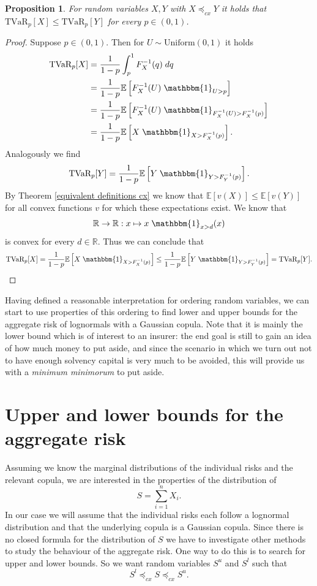\documentclass{article}
\newtheorem{proposition}{Proposition}
\begin{document}
\begin{proposition}\cite[Theorem 6.5.2]{Risk_Measurement}\label{prop: tvar consistent with convex order}
    For random variables $X,Y$ with $X\preceq_{cx}Y$ it holds that $\text{TVaR}_p[X]\leq \text{TVaR}_p[Y] $ for every $p\in (0,1)$.
\end{proposition}
\begin{proof}
    Suppose $p\in (0,1)$. Then for $U\sim \text{Uniform}(0,1)$ it holds
    \begin{align*}
        \text{TVaR}_p[X] &= \frac{1}{1-p} \int_p^1F_X^{-1}(q)\;dq\\
        &= \frac{1}{1-p} \mathbb{E}\left[F_X^{-1}(U)\;\mathbbm{1}_{U > p}\right]\\
        &= \frac{1}{1-p} \mathbb{E}\left[F_X^{-1}(U)\;\mathbbm{1}_{F_X^{-1}(U) > F_X^{-1}(p)}\right] \\
        &= \frac{1}{1-p} \mathbb{E}\left[X\;\mathbbm{1}_{X > F_X^{-1}(p)}\right].
    \end{align*}
    Analogously we find 
    $$ \text{TVaR}_p[Y] = \frac{1}{1-p} \mathbb{E}\left[Y\;\mathbbm{1}_{Y > F_Y^{-1}(p)}\right].$$
    By Theorem \ref{equivalent definitions cx} we know that $\mathbb{E}[v(X)]\leq \mathbb{E}[v(Y)]$ for all convex functions $v$ for which these expectations exist. We know that 
    $$\mathbb{R}\rightarrow \mathbb{R}:x\mapsto x\;\mathbbm{1}_{x>d}(x)$$
    is convex for every $d\in \mathbb{R}$. Thus we can conclude that
    $$\text{TVaR}_p[X] = \frac{1}{1-p} \mathbb{E}\left[X\;\mathbbm{1}_{X > F_X^{-1}(p)}\right]\leq \frac{1}{1-p} \mathbb{E}\left[Y\;\mathbbm{1}_{Y > F_Y^{-1}(p)}\right]  = \text{TVaR}_p[Y].$$
\end{proof}

Having defined a reasonable interpretation for ordering random variables, we can start to use properties of this ordering to find lower and upper bounds for the aggregate risk of lognormals with a Gaussian copula. Note that it is mainly the lower bound which is of interest to an insurer: the end goal is still to gain an idea of how much money to put aside, and since the scenario in which we turn out not to have enough solvency capital is very much to be avoided, this will provide us with a \textit{minimum minimorum} to put aside.

\section{Upper and lower bounds for the aggregate risk}\label{section: upper and lower bounds}
Assuming we know the marginal distributions of the individual risks and the relevant copula, we are interested in the properties of the distribution of $$S = \sum_{i=1}^n X_i.$$ In our case we will assume that the individual risks each follow a lognormal distribution and that the underlying copula is a Gaussian copula. Since there is no closed formula for the distribution of $S$ we have to investigate other methods to study the behaviour of the aggregate risk. One way to do this is to search for upper and lower bounds. So we want random variables $S^u$ and $S^l$ such that 
$$ S^l \preceq_{cx} S \preceq_{cx} S^u.$$
\end{document}
